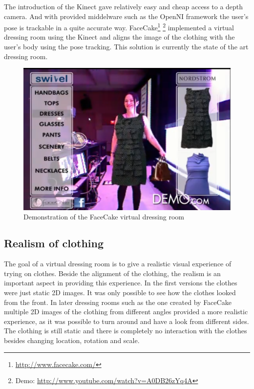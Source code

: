 \documentclass[twocolumn,a4paper]{article}
\begin{document}
The introduction of the Kinect gave relatively easy and cheap access to a depth camera. And with provided middelware such as the OpenNI framework the user's pose is trackable in a quite accurate way. FaceCake\footnote{\url{http://www.facecake.com/}} \footnote{Demo: \url{http://www.youtube.com/watch?v=A0DB26zYq4A}} implemented a virtual dressing room using the Kinect and aligns the image of the clothing with the user's body using the pose tracking. This solution is currently the state of the art dressing room.

\begin{figure}[htp]
\centering
\includegraphics[scale=0.1]{facecake.png} 
\caption{Demonstration of the FaceCake virtual dressing room}
\label{fig:facecake}
\end{figure}

\subsection{Realism of clothing}

The goal of a virtual dressing room is to give a realistic visual experience of trying on clothes. Beside the alignment of the clothing, the realism is an important aspect in providing this experience. In the first versions the clothes were just static 2D images. It was only possible to see how the clothes looked from the front. In later dressing rooms such as the one created by FaceCake multiple 2D images of the clothing from different angles provided a more realistic experience, as it was possible to turn around and have a look from different sides. The clothing is still static and there is completely no interaction with the clothes besides changing location, rotation and scale.
\end{document}
